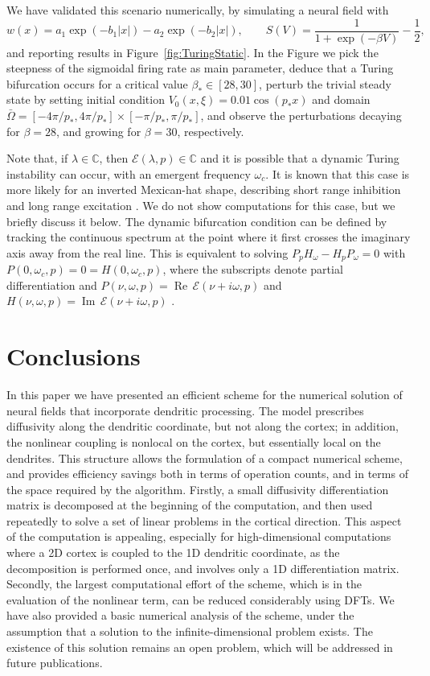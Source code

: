 \documentclass[a4paper,final]{siamart190516}
\newcommand{\Real}{\operatorname{Re}}    %
\newcommand{\Imag}{\operatorname{Im}}
\newcommand{\Cb}{\mathbb{C}}
\begin{document}
We have validated this scenario numerically, by simulating a neural field with
\begin{equation}\label{eq:mexicanHatKernel}
  w(x) = a_1 \exp(-b_1 |x|) - a_2 \exp(-b_2 |x|), \qquad S(V) = \frac{1}{1 +
  \exp{(-\beta V)}} - \frac{1}{2},
\end{equation}
and reporting results in Figure~\ref{fig:TuringStatic}. In the Figure we pick the
steepness of the sigmoidal firing rate as main parameter, deduce that
a Turing bifurcation occurs for a critical value $\beta_* \in [28,30]$, perturb the
trivial steady state by setting initial condition $V_0(x,\xi) = 0.01 \cos(p_* x)$ and
domain $\bar \Omega = [-4\pi/p_*, 4\pi/p_*] \times [-\pi/p_*,\pi/p_*]$, and observe
the perturbations decaying for $\beta = 28$, and growing for $\beta = 30$, respectively.

Note that, if $\lambda \in \Cb$, then $\mathcal{E}(\lambda,p) \in \Cb$ and it is
possible that a dynamic Turing instability can occur, with an emergent frequency $\omega_c$.  It is
known that this case is more likely for an inverted Mexican-hat shape, describing
short range inhibition and long range excitation \cite{Bressloff96}. We do not show
computations for this case, but we briefly discuss it below. The dynamic
bifurcation condition can be defined by tracking the continuous spectrum at the point
where it first crosses the imaginary axis away from the real line.  This is
equivalent to solving $P_p H_\omega - H_p P_\omega = 0$ with $P(0,\omega_c,p) = 0 =
H(0,\omega_c,p)$, where the subscripts denote partial differentiation and
$P(\nu,\omega,p) = \Real \, \mathcal{E}(\nu + i \omega,p)$ and $H(\nu,\omega,p) =
\Imag \, \mathcal{E}(\nu + i \omega,p)$ \cite[Chapter 1]{Coombes2005}.

\section{Conclusions} \label{sec:conclusions}
In this paper we have presented an efficient scheme for the
numerical solution of neural fields that incorporate dendritic processing. The model
prescribes diffusivity along the dendritic coordinate, but not along the cortex; in
addition, the nonlinear coupling is nonlocal on the cortex, but essentially local on
the dendrites. This structure allows the formulation of a compact numerical scheme,
and provides efficiency savings both in terms of operation counts, and in terms of
the space required by the algorithm. Firstly, a small diffusivity differentiation
matrix is decomposed at the beginning of the computation, and then used repeatedly
to solve a set of linear problems in the cortical direction. This aspect of the
computation is appealing, especially for high-dimensional computations where a 2D
cortex is coupled to the 1D dendritic coordinate, as the decomposition is performed
once, and involves only a 1D differentiation matrix. Secondly, the largest
computational effort of the scheme, which is in the evaluation of the nonlinear term, can be
reduced considerably using DFTs. We
have also provided a basic numerical analysis of the scheme, under the assumption that a
solution to the infinite-dimensional problem exists. The existence of this solution
remains an open problem, which will be addressed in future publications. 
\end{document}
